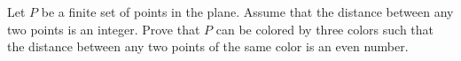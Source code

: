 Let $P$ be a finite set of points in the plane. Assume that the distance between any two points is an integer. Prove that $P$ can be colored by three colors such that the distance between any two points of the same color is an even number.